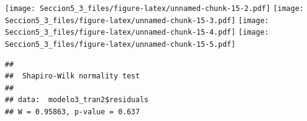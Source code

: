 \documentclass[
]{article}
\newenvironment{Shaded}{\begin{snugshade}}{\end{snugshade}}
\newcommand{\FunctionTok}[1]{\textcolor[rgb]{0.00,0.00,0.00}{#1}}
\newcommand{\NormalTok}[1]{#1}
\newcommand{\SpecialCharTok}[1]{\textcolor[rgb]{0.00,0.00,0.00}{#1}}
\begin{document}
\texttt{[image: Seccion5\_3\_files/figure-latex/unnamed-chunk-15-2.pdf]}
\texttt{[image: Seccion5\_3\_files/figure-latex/unnamed-chunk-15-3.pdf]}
\texttt{[image: Seccion5\_3\_files/figure-latex/unnamed-chunk-15-4.pdf]}
\texttt{[image: Seccion5\_3\_files/figure-latex/unnamed-chunk-15-5.pdf]}

\begin{Shaded}
\end{Shaded}

\begin{verbatim}
## 
##  Shapiro-Wilk normality test
## 
## data:  modelo3_tran2$residuals
## W = 0.95863, p-value = 0.637
\end{verbatim}
\end{document}
